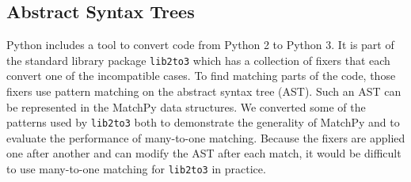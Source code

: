 \documentclass[conference,compsoc]{IEEEtran}
\begin{document}


\subsection{Abstract Syntax Trees}

Python includes a tool to convert code from Python 2 to Python 3.
It is part of the standard library package \texttt{lib2to3} which has a collection of \textquotedbl{}fixers\textquotedbl{} that each convert one of the incompatible cases.
To find matching parts of the code, those fixers use pattern matching on the abstract syntax tree (AST).
Such an AST can be represented in the MatchPy data structures.
We converted some of the patterns used by \texttt{lib2to3} both to demonstrate the generality of MatchPy and to evaluate the performance of many-to-one matching.
Because the fixers are applied one after another and can modify the AST after each match,
it would be difficult to use many-to-one matching for \texttt{lib2to3} in practice.
\end{document}
